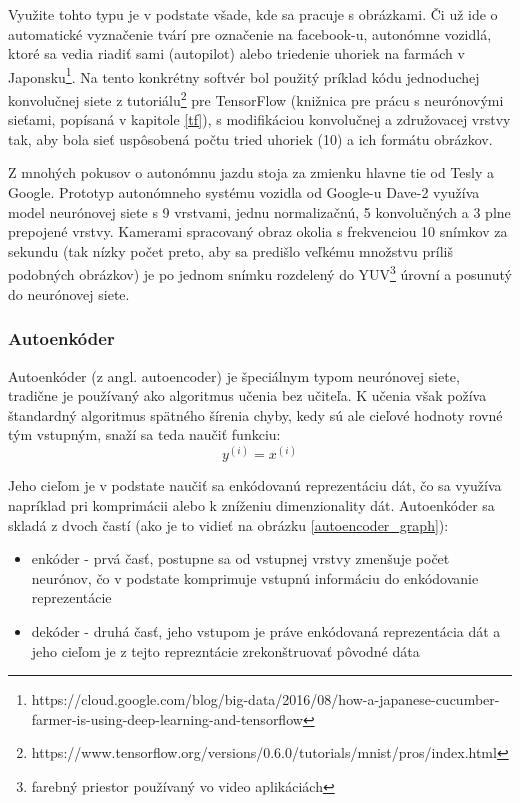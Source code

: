 	Využite tohto typu je v podstate všade, kde sa pracuje s obrázkami. Či už ide o automatické vyznačenie tvárí pre označenie na facebook-u, autonómne vozidlá, ktoré sa vedia riadiť sami (autopilot) alebo triedenie uhoriek na farmách v Japonsku\footnote{https://cloud.google.com/blog/big-data/2016/08/how-a-japanese-cucumber-farmer-is-using-deep-learning-and-tensorflow}. Na tento konkrétny softvér bol použitý príklad kódu jednoduchej konvolučnej siete z tutoriálu\footnote{https://www.tensorflow.org/versions/0.6.0/tutorials/mnist/pros/index.html} pre TensorFlow (knižnica pre prácu s neurónovými sieťami, popísaná v kapitole \ref{tf}), s modifikáciou konvolučnej a združovacej vrstvy tak, aby bola sieť uspôsobená počtu tried uhoriek (10) a ich formátu obrázkov. 
	
	Z mnohých pokusov o autonómnu jazdu stoja za zmienku hlavne tie od Tesly a Google. Prototyp autonómneho systému vozidla od Google-u Dave-2\cite{google_car} využíva model neurónovej siete s 9 vrstvami, jednu normalizačnú, 5 konvolučných a 3 plne prepojené vrstvy. Kamerami spracovaný obraz okolia s frekvenciou 10 snímkov za sekundu (tak nízky počet preto, aby sa predišlo veľkému množstvu príliš podobných obrázkov) je po jednom snímku rozdelený do YUV\footnote{farebný priestor používaný vo video aplikáciách} úrovní a posunutý do neurónovej siete.   
 
\subsubsection{Autoenkóder}
\label{autoencoder}
Autoenkóder (z angl. autoencoder) je špeciálnym typom neurónovej siete, tradične je používaný ako algoritmus učenia bez učiteľa. K učenia však požíva štandardný algoritmus spätného šírenia chyby, kedy sú ale cieľové hodnoty rovné tým vstupným, snaží sa teda naučiť funkciu:
\begin{equation}
	y^{(i)} = x^{(i)}
\end{equation}

Jeho cieľom je v podstate naučiť sa enkódovanú reprezentáciu dát, čo sa využíva napríklad pri komprimácii alebo k zníženiu dimenzionality dát\cite{autoencoder_dimensionality}. Autoenkóder sa skladá z dvoch častí (ako je to vidieť na obrázku \ref{autoencoder_graph}):
\begin{itemize}
	\item enkóder - prvá časť, postupne sa od vstupnej vrstvy zmenšuje počet neurónov, čo v podstate komprimuje vstupnú informáciu do enkódovanie reprezentácie
	\item dekóder - druhá časť, jeho vstupom je práve enkódovaná reprezentácia dát a jeho cieľom je z tejto reprezntácie zrekonštruovať pôvodné dáta
\end{itemize}
 

